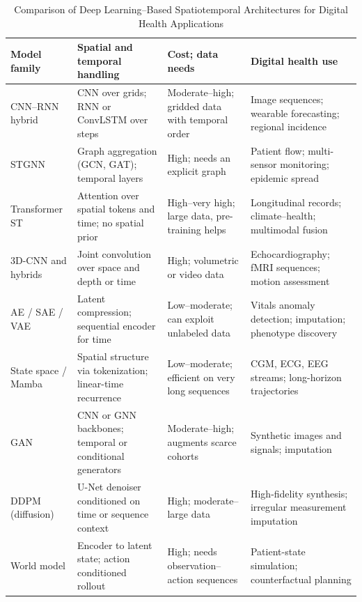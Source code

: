 \documentclass[journal]{IEEEtran}
\newif\ifsubmission
\begin{document}
\begin{table}[htbp]
\centering
\caption{Comparison of Deep Learning--Based Spatiotemporal Architectures for Digital Health Applications}
\label{tab:st-model-comparison}
\ifsubmission
\scriptsize
\setlength{\tabcolsep}{4pt}
\renewcommand{\arraystretch}{1.05}
\begin{tabularx}{\textwidth}{>{\raggedright\arraybackslash}p{2.4cm} >{\raggedright\arraybackslash}X >{\raggedright\arraybackslash}p{4.0cm} >{\raggedright\arraybackslash}X}
\toprule
\textbf{Model family} & \textbf{Spatial and temporal handling} & \textbf{Cost; data needs} & \textbf{Digital health use} \\
\midrule
CNN--RNN hybrid & CNN over grids; RNN or ConvLSTM over steps & Moderate--high; gridded data with temporal order & Image sequences; wearable forecasting; regional incidence \\
\addlinespace[2pt]
STGNN & Graph aggregation (GCN, GAT); temporal layers & High; needs an explicit graph & Patient flow; multi-sensor monitoring; epidemic spread \\
\addlinespace[2pt]
Transformer ST & Attention over spatial tokens and time; no spatial prior & High--very high; large data, pre-training helps & Longitudinal records; climate--health; multimodal fusion \\
\addlinespace[2pt]
3D-CNN and hybrids & Joint convolution over space and depth or time & High; volumetric or video data & Echocardiography; fMRI sequences; motion assessment \\
\addlinespace[2pt]
AE / SAE / VAE & Latent compression; sequential encoder for time & Low--moderate; can exploit unlabeled data & Vitals anomaly detection; imputation; phenotype discovery \\
\addlinespace[2pt]
State space / Mamba & Spatial structure via tokenization; linear-time recurrence & Low--moderate; efficient on very long sequences & CGM, ECG, EEG streams; long-horizon trajectories \\
\addlinespace[2pt]
GAN & CNN or GNN backbones; temporal or conditional generators & Moderate--high; augments scarce cohorts & Synthetic images and signals; imputation \\
\addlinespace[2pt]
DDPM (diffusion) & U-Net denoiser conditioned on time or sequence context & High; moderate--large data & High-fidelity synthesis; irregular measurement imputation \\
\addlinespace[2pt]
World model & Encoder to latent state; action conditioned rollout & High; needs observation--action sequences & Patient-state simulation; counterfactual planning \\

\end{tabularx}
\end{table}
\end{document}
